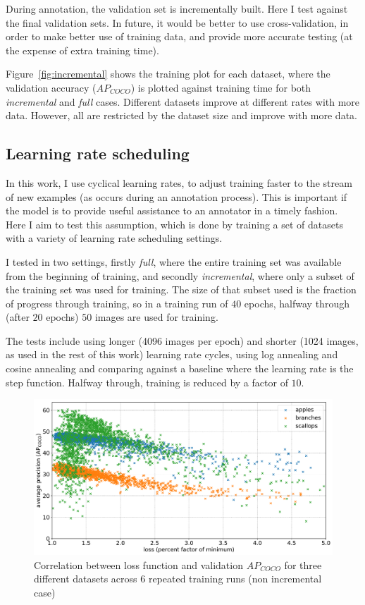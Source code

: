 During annotation, the validation set is incrementally built. Here I test against the final validation sets. In future, it would be better to use cross-validation, in order to make better use of training data, and provide more accurate testing (at the expense of extra training time). 

Figure~\ref{fig:incremental} shows the training plot for each dataset, where the validation accuracy ($AP_{COCO}$) is plotted against training time for both \emph{incremental} and \emph{full} cases. Different datasets improve at different rates with more data. However, all are restricted by the dataset size and improve with more data.

\subsection {Learning rate scheduling}
\label{sec:lr_schedule_exp}

In this work, I use cyclical learning rates, to adjust training faster to the stream of new examples (as occurs during an annotation process). This is important if the model is to provide useful assistance to an annotator in a timely fashion. Here I aim to test this assumption, which is done by training a set of datasets with a variety of learning rate scheduling settings. 

I tested in two settings, firstly \emph{full}, where the entire training set was available from the beginning of training, and secondly \emph{incremental}, where only a subset of the training set was used for training. The size of that subset used is the fraction of progress through training, so in a training run of $40$ epochs, halfway through (after $20$ epochs) $50$ images are used for training. 

The tests include using longer (4096 images per epoch) and shorter (1024 images, as used in the rest of this work) learning rate cycles, using log annealing and cosine annealing and comparing against a baseline where the learning rate is the step function. Halfway through, training is reduced by a factor of $10$.

\begin{figure}[htb]
  \centering
  \includegraphics[width=1.0\linewidth]{charts/training/lr_schedule/scatter_loss_ap.pdf}
  \caption{Correlation between loss function and validation $AP_{COCO}$ for three different datasets across 6 repeated training runs (non incremental case)}  
  \label{fig:scatter_loss_ap}
\end{figure}

